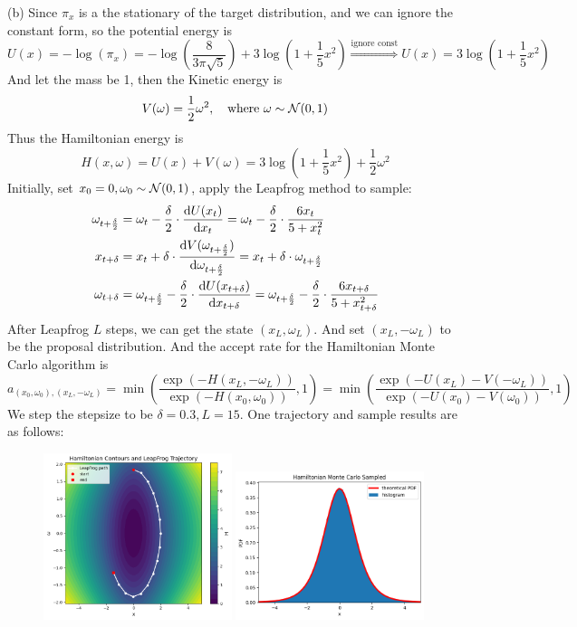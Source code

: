 \begin{homeworkProblem}
(b) Since $\pi_x$ is a the stationary of the target distribution, and we can ignore the constant form, so the potential energy is
$$U(x)=-\log(\pi_x) = -\log\left(\dfrac{8}{3\pi\sqrt{5}}\right) + 3\log\left(1+\frac{1}{5}x^2\right) \stackrel{\text{ignore const}}{\Rightarrow} U(x)=3\log\left(1+\frac{1}{5}x^2\right)$$
And let the mass be 1, then the Kinetic energy is
$$V(\omega)=\dfrac{1}{2}\omega^2, \quad\text{where } \omega\sim\mathcal{N}(0,1)$$
Thus the Hamiltonian energy is
$$H(x,\omega)=U(x)+V(\omega)=3\log\left(1+\frac{1}{5}x^2\right)+\dfrac{1}{2}\omega^2$$
Initially, set $x_0=0, \omega_0\sim\mathcal{N}(0,1)$, apply the Leapfrog method to sample:
\begin{align*}
\omega_{t+\frac{\delta}{2}} &= \omega_t - \frac{\delta}{2}\cdot \dfrac{\mathrm{d}U(x_t)}{\mathrm{d}x_t} = \omega_t - \frac{\delta}{2}\cdot \dfrac{6x_t}{5+x_t^2} \\
x_{t+\delta} &= x_t + \delta \cdot \dfrac{\mathrm{d}V(\omega_{t+\frac{\delta}{2}})}{\mathrm{d}\omega_{t+\frac{\delta}{2}}} = x_t + \delta\cdot \omega_{t+\frac{\delta}{2}} \\
\omega_{t+\delta} &= \omega_{t+\frac{\delta}{2}} - \frac{\delta}{2}\cdot \dfrac{\mathrm{d}U(x_{t+\delta})}{\mathrm{d}x_{t+\delta}} = \omega_{t+\frac{\delta}{2}} - \frac{\delta}{2}\cdot \dfrac{6x_{t+\delta}}{5+x_{t+\delta}^2}
\end{align*}
After Leapfrog $L$ steps, we can get the state $(x_L, \omega_L)$. And set $(x_L, -\omega_L)$ to be the proposal distribution. And the accept rate for the Hamiltonian Monte Carlo algorithm is
$$a_{(x_0,\omega_0),(x_L,-\omega_L)}=\min\left(\dfrac{\exp\left(-H(x_L,-\omega_L)\right)}{\exp\left(-H(x_0,\omega_0)\right)}, 1\right)=\min\left(\dfrac{\exp\left(-U(x_L)-V(-\omega_L)\right)}{\exp\left(-U(x_0)-V(\omega_0)\right)}, 1\right)$$
We step the stepsize to be $\delta=0.3, L=15$. One trajectory and sample results are as follows:
\begin{figure}[h]
    \centering
    \includegraphics[width=0.49\textwidth]{./figure/p10/trajectory.png}
    \includegraphics[width=0.49\textwidth]{./figure/p10/Hamiltonian.png}
\end{figure}


\end{homeworkProblem}
